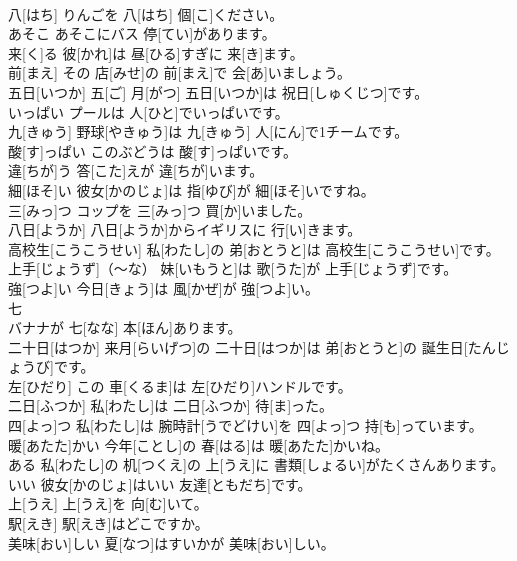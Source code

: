 \documentclass[8pt]{extreport}
\begin{document}
\begin{CJK}{UTF8}{min}
\\	八[はち]	りんごを 八[はち] 個[こ]ください。		
\\	あそこ	あそこにバス 停[てい]があります。		
\\	来[く]る	彼[かれ]は 昼[ひる]すぎに 来[き]ます。		
\\	前[まえ]	その 店[みせ]の 前[まえ]で 会[あ]いましょう。		
\\	五日[いつか]	五[ご] 月[がつ] 五日[いつか]は 祝日[しゅくじつ]です。		
\\	いっぱい	プールは 人[ひと]でいっぱいです。		
\\	九[きゅう]	野球[やきゅう]は 九[きゅう] 人[にん]で1チームです。		
\\	酸[す]っぱい	このぶどうは 酸[す]っぱいです。		
\\	違[ちが]う	答[こた]えが 違[ちが]います。		
\\	細[ほそ]い	彼女[かのじょ]は 指[ゆび]が 細[ほそ]いですね。		
\\	三[みっ]つ	コップを 三[みっ]つ 買[か]いました。		
\\	八日[ようか]	八日[ようか]からイギリスに 行[い]きます。		
\\	高校生[こうこうせい]	私[わたし]の 弟[おとうと]は 高校生[こうこうせい]です。		
\\	上手[じょうず]（～な）	妹[いもうと]は 歌[うた]が 上手[じょうず]です。		
\\	強[つよ]い	今日[きょう]は 風[かぜ]が 強[つよ]い。		
\\	七
\\	[なな]	バナナが 七[なな] 本[ほん]あります。		
\\	二十日[はつか]	来月[らいげつ]の 二十日[はつか]は 弟[おとうと]の 誕生日[たんじょうび]です。		
\\	左[ひだり]	この 車[くるま]は 左[ひだり]ハンドルです。		
\\	二日[ふつか]	私[わたし]は 二日[ふつか] 待[ま]った。		
\\	四[よっ]つ	私[わたし]は 腕時計[うでどけい]を 四[よっ]つ 持[も]っています。		
\\	暖[あたた]かい	今年[ことし]の 春[はる]は 暖[あたた]かいね。		
\\	ある	私[わたし]の 机[つくえ]の 上[うえ]に 書類[しょるい]がたくさんあります。		
\\	いい	彼女[かのじょ]はいい 友達[ともだち]です。		
\\	上[うえ]	上[うえ]を 向[む]いて。		
\\	駅[えき]	駅[えき]はどこですか。		
\\	美味[おい]しい	夏[なつ]はすいかが 美味[おい]しい。		

\end{CJK}
\end{document}
